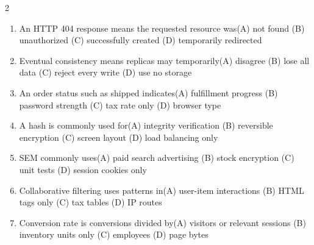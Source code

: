\documentclass[a4paper]{article}
\begin{document}
\begin{multicols*}{2}
\begin{enumerate}[resume]
\item An HTTP 404 response means the requested resource was\newline\hspace*{0.6em}(A) not found \quad (B) unauthorized \newline\hspace*{0.6em}(C) successfully created \quad (D) temporarily redirected
\item Eventual consistency means replicas may temporarily\newline\hspace*{0.6em}(A) disagree \quad (B) lose all data \newline\hspace*{0.6em}(C) reject every write \quad (D) use no storage
\item An order status such as shipped indicates\newline\hspace*{0.6em}(A) fulfillment progress \quad (B) password strength \newline\hspace*{0.6em}(C) tax rate only \quad (D) browser type
\item A hash is commonly used for\newline\hspace*{0.6em}(A) integrity verification \quad (B) reversible encryption \newline\hspace*{0.6em}(C) screen layout \quad (D) load balancing only
\item SEM commonly uses\newline\hspace*{0.6em}(A) paid search advertising \quad (B) stock encryption \newline\hspace*{0.6em}(C) unit tests \quad (D) session cookies only
\item Collaborative filtering uses patterns in\newline\hspace*{0.6em}(A) user-item interactions \quad (B) HTML tags only \newline\hspace*{0.6em}(C) tax tables \quad (D) IP routes
\item Conversion rate is conversions divided by\newline\hspace*{0.6em}(A) visitors or relevant sessions \quad (B) inventory units only \newline\hspace*{0.6em}(C) employees \quad (D) page bytes

\end{enumerate}
\end{multicols*}
\end{document}

